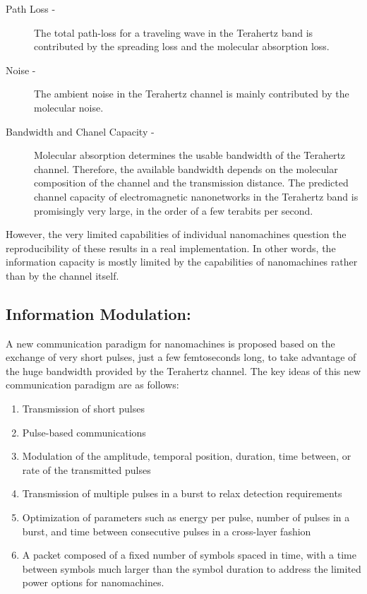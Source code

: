 \documentclass{report}
\begin{document}
    \begin{enumerate}
        \begin{description}
            \item[Path Loss - ]The total path-loss for a traveling wave in the Terahertz band is contributed by the spreading loss and the molecular absorption loss.
            \item[Noise - ]The ambient noise in the Terahertz channel is mainly contributed by the molecular noise.
            \item[Bandwidth and Chanel Capacity - ]Molecular absorption determines the usable bandwidth of the Terahertz channel. Therefore, the available bandwidth depends on the molecular composition of the channel and the transmission distance. The predicted channel capacity of electromagnetic nanonetworks in the Terahertz band is promisingly very large, in the order of a few terabits per second.
        \end{description}
    \end{enumerate}

    However, the very limited capabilities of individual nanomachines question the reproducibility of these results in a real implementation. In other words, the information capacity is mostly limited by the capabilities of nanomachines rather than by the channel itself.

\subsection*{Information Modulation:}

    A new communication paradigm for nanomachines is proposed based on the exchange of very short pulses, just a few femtoseconds long, to take advantage of the huge bandwidth provided by the Terahertz channel. The key ideas of this new communication paradigm are as follows:
    \begin{enumerate}
        \item Transmission of short pulses
        \item Pulse-based communications
        \item Modulation of the amplitude, temporal position, duration, time between, or rate of the transmitted pulses
        \item Transmission of multiple pulses in a burst to relax detection requirements
        \item Optimization of parameters such as energy per pulse, number of pulses in a burst, and time between consecutive pulses in a cross-layer fashion
        \item A packet composed of a fixed number of symbols spaced in time, with a time between symbols much larger than the symbol duration to address the limited power options for nanomachines.
    \end{enumerate}
\end{document}
